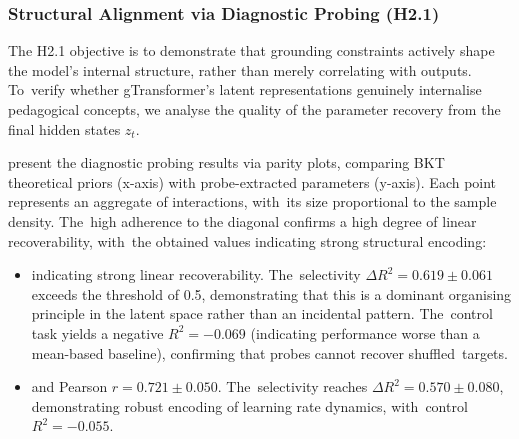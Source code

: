 \documentclass[applsci,article,accept,moreauthors,pdftex]{Definitions/mdpi}
\begin{document}
\subsubsection{Structural Alignment via Diagnostic Probing (H2.1)} \label{sec_structural_alignment}

The H2.1 objective is to demonstrate that grounding constraints actively shape the model's internal structure, rather than merely correlating with outputs. To~verify whether gTransformer's latent representations genuinely {internalise} pedagogical concepts, we analyse the quality of the parameter recovery from the final hidden states $z_t$. 

 present the diagnostic probing results via parity plots, comparing BKT theoretical priors (x-axis) with probe-extracted parameters (y-axis). Each point represents an aggregate of interactions, with~its size proportional to the sample density. The~high adherence to the diagonal confirms a high degree of linear recoverability, with~the obtained values indicating strong structural encoding:

\begin{itemize}
    \item {} indicating strong linear recoverability. The~selectivity $\Delta R^2 = 0.619 \pm 0.061$ exceeds the threshold of 0.5, demonstrating that this is a dominant {organising} principle in the latent space rather than an incidental pattern. The~control task yields a negative $R^2 = -0.069$ (indicating performance worse than a mean-based baseline), confirming that probes cannot recover shuffled~targets.
    
    \item {} and Pearson $r = 0.721 \pm 0.050$. The~selectivity reaches $\Delta R^2 = 0.570 \pm 0.080$, demonstrating robust encoding of learning rate dynamics, with~control $R^2 = -0.055$.
\end{itemize}

\end{document}
